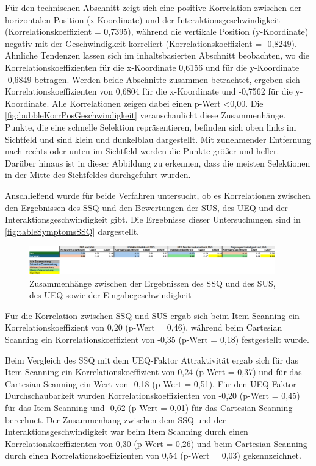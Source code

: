 Für den technischen Abschnitt zeigt sich eine positive Korrelation zwischen der horizontalen Position (x-Koordinate) und der Interaktionsgeschwindigkeit (Korrelationskoeffizient = 0,7395), während die vertikale Position (y-Koordinate) negativ mit der Geschwindigkeit korreliert (Korrelationskoeffizient = -0,8249). Ähnliche Tendenzen lassen sich im inhaltsbasierten Abschnitt beobachten, wo die Korrelationskoeffizienten für die x-Koordinate 0,6156 und für die y-Koordinate -0,6849 betragen. Werden beide Abschnitte zusammen betrachtet, ergeben sich Korrelationskoeffizienten von 0,6804 für die x-Koordinate und -0,7562 für die y-Koordinate. Alle Korrelationen zeigen dabei einen p-Wert <0,00. Die \autoref{fig:bubbleKorrPosGeschwindigkeit} veranschaulicht diese Zusammenhänge. Punkte, die eine schnelle Selektion repräsentieren, befinden sich oben links im Sichtfeld und sind klein und dunkelblau dargestellt. Mit zunehmender Entfernung nach rechts oder unten im Sichtfeld werden die Punkte größer und heller. Darüber hinaus ist in dieser Abbildung zu erkennen, dass die meisten Selektionen in der Mitte des Sichtfeldes durchgeführt wurden.

Anschließend wurde für beide Verfahren untersucht, ob es Korrelationen zwischen den Ergebnissen des SSQ und den Bewertungen der SUS, des UEQ und der Interaktionsgeschwindigkeit gibt. Die Ergebnisse dieser Untersuchungen sind in \autoref{fig:tableSymptomsSSQ} dargestellt.

\begin{figure}[tbh]
    \centering
    \includegraphics[width=0.95\textwidth]{images/Results/Korrelationen-SSQ.png}
    \caption{Zusammenhänge zwischen der Ergebnissen des SSQ und des SUS, des UEQ sowie der Eingabegeschwindigkeit}
    \label{fig:TableKorrelationenSSQ}
\end{figure}

Für die Korrelation zwischen SSQ und SUS ergab sich beim Item Scanning ein Korrelationskoeffizient von 0,20 (p-Wert = 0,46), während beim Cartesian Scanning ein Korrelationskoeffizient von -0,35 (p-Wert = 0,18) festgestellt wurde. 

Beim Vergleich des SSQ mit dem UEQ-Faktor Attraktivität ergab sich für das Item Scanning ein Korrelationskoeffizient von 0,24 (p-Wert = 0,37) und für das Cartesian Scanning ein Wert von -0,18 (p-Wert = 0,51). Für den UEQ-Faktor Durchschaubarkeit wurden Korrelationskoeffizienten von -0,20 (p-Wert = 0,45) für das Item Scanning und -0,62 (p-Wert = 0,01) für das Cartesian Scanning berechnet. Der Zusammenhang zwischen dem SSQ und der Interaktionsgeschwindigkeit war beim Item Scanning durch einen Korrelationskoeffizienten von 0,30 (p-Wert = 0,26) und beim Cartesian Scanning durch einen Korrelationskoeffizienten von 0,54 (p-Wert = 0,03) gekennzeichnet.

